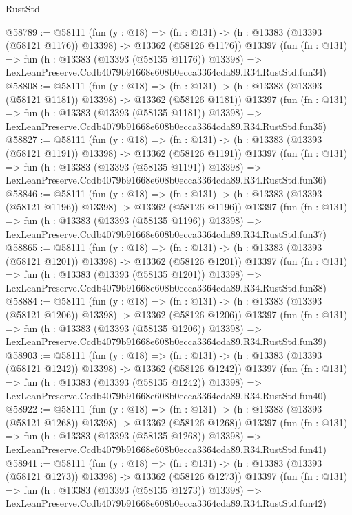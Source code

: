 \begin{lexlean}{RustStd}
\begin{coremodule}
@58789 := @58111
    (fun (y : @18) =>
    (fn : @131) -> (h : @13383 (@13393 (@58121 @1176)) @13398) -> @13362 (@58126 @1176))
    @13397
    (fun (fn : @131) =>
    fun (h : @13383 (@13393 (@58135 @1176)) @13398) =>
    LexLeanPreserve.Ccdb4079b91668e608b0ecca3364cda89.R34.RustStd.fun34)
@58808 := @58111
    (fun (y : @18) =>
    (fn : @131) -> (h : @13383 (@13393 (@58121 @1181)) @13398) -> @13362 (@58126 @1181))
    @13397
    (fun (fn : @131) =>
    fun (h : @13383 (@13393 (@58135 @1181)) @13398) =>
    LexLeanPreserve.Ccdb4079b91668e608b0ecca3364cda89.R34.RustStd.fun35)
@58827 := @58111
    (fun (y : @18) =>
    (fn : @131) -> (h : @13383 (@13393 (@58121 @1191)) @13398) -> @13362 (@58126 @1191))
    @13397
    (fun (fn : @131) =>
    fun (h : @13383 (@13393 (@58135 @1191)) @13398) =>
    LexLeanPreserve.Ccdb4079b91668e608b0ecca3364cda89.R34.RustStd.fun36)
@58846 := @58111
    (fun (y : @18) =>
    (fn : @131) -> (h : @13383 (@13393 (@58121 @1196)) @13398) -> @13362 (@58126 @1196))
    @13397
    (fun (fn : @131) =>
    fun (h : @13383 (@13393 (@58135 @1196)) @13398) =>
    LexLeanPreserve.Ccdb4079b91668e608b0ecca3364cda89.R34.RustStd.fun37)
@58865 := @58111
    (fun (y : @18) =>
    (fn : @131) -> (h : @13383 (@13393 (@58121 @1201)) @13398) -> @13362 (@58126 @1201))
    @13397
    (fun (fn : @131) =>
    fun (h : @13383 (@13393 (@58135 @1201)) @13398) =>
    LexLeanPreserve.Ccdb4079b91668e608b0ecca3364cda89.R34.RustStd.fun38)
@58884 := @58111
    (fun (y : @18) =>
    (fn : @131) -> (h : @13383 (@13393 (@58121 @1206)) @13398) -> @13362 (@58126 @1206))
    @13397
    (fun (fn : @131) =>
    fun (h : @13383 (@13393 (@58135 @1206)) @13398) =>
    LexLeanPreserve.Ccdb4079b91668e608b0ecca3364cda89.R34.RustStd.fun39)
@58903 := @58111
    (fun (y : @18) =>
    (fn : @131) -> (h : @13383 (@13393 (@58121 @1242)) @13398) -> @13362 (@58126 @1242))
    @13397
    (fun (fn : @131) =>
    fun (h : @13383 (@13393 (@58135 @1242)) @13398) =>
    LexLeanPreserve.Ccdb4079b91668e608b0ecca3364cda89.R34.RustStd.fun40)
@58922 := @58111
    (fun (y : @18) =>
    (fn : @131) -> (h : @13383 (@13393 (@58121 @1268)) @13398) -> @13362 (@58126 @1268))
    @13397
    (fun (fn : @131) =>
    fun (h : @13383 (@13393 (@58135 @1268)) @13398) =>
    LexLeanPreserve.Ccdb4079b91668e608b0ecca3364cda89.R34.RustStd.fun41)
@58941 := @58111
    (fun (y : @18) =>
    (fn : @131) -> (h : @13383 (@13393 (@58121 @1273)) @13398) -> @13362 (@58126 @1273))
    @13397
    (fun (fn : @131) =>
    fun (h : @13383 (@13393 (@58135 @1273)) @13398) =>
    LexLeanPreserve.Ccdb4079b91668e608b0ecca3364cda89.R34.RustStd.fun42)

\end{coremodule}
\end{lexlean}
